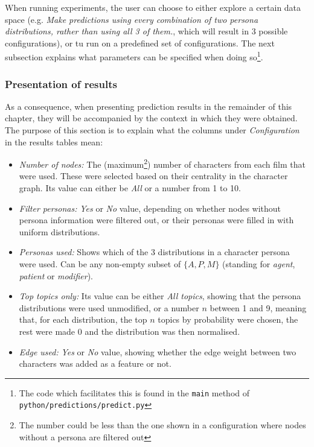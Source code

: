 \documentclass[bsc,frontabs,singlespacing,parskip]{infthesis} %
\begin{document}
When running experiments, the user can choose to either explore a certain data space (e.g. \textit{Make predictions using every combination of two persona distributions, rather than using all 3 of them.}, which will result in 3 possible configurations), or tu run on a predefined set of configurations. The next subsection explains what parameters can be specified when doing so\footnote{The code which facilitates this is found in the \texttt{main} method of \texttt{python/predictions/predict.py}}. 

\subsubsection{Presentation of results}
As a consequence, when presenting prediction results in the remainder of this chapter, they will be accompanied by the context in which they were obtained. The purpose of this section is to explain what the columns under \textit{Configuration} in the results tables mean:
\begin{itemize}
	\item \textit{Number of nodes:} The (maximum\footnote{The number could be less than the one shown in a configuration where nodes without a persona are filtered out}) number of characters from each film that were used. These were selected based on their centrality in the character graph. Its value can either be \textit{All} or a number from 1 to 10.
	\item \textit{Filter personas:} \textit{Yes} or \textit{No} value, depending on whether nodes without persona information were filtered out, or their personas were filled in with uniform distributions.
	\item \textit{Personas used:} Shows which of the 3 distributions in a character persona were used. Can be any non-empty subset of $\{A, P, M\}$ (standing for \textit{agent}, \textit{patient} or \textit{modifier}).
	\item \textit{Top topics only:} Its value can be either \textit{All topics}, showing that the persona distributions were used unmodified, or a number $n$ between 1 and 9, meaning that, for each distribution, the top $n$ topics by probability were chosen, the rest were made 0 and the distribution was then normalised.
	\item \textit{Edge used:} \textit{Yes} or \textit{No} value, showing whether the edge weight between two characters was added as a feature or not.
\end{itemize}
\end{document}
